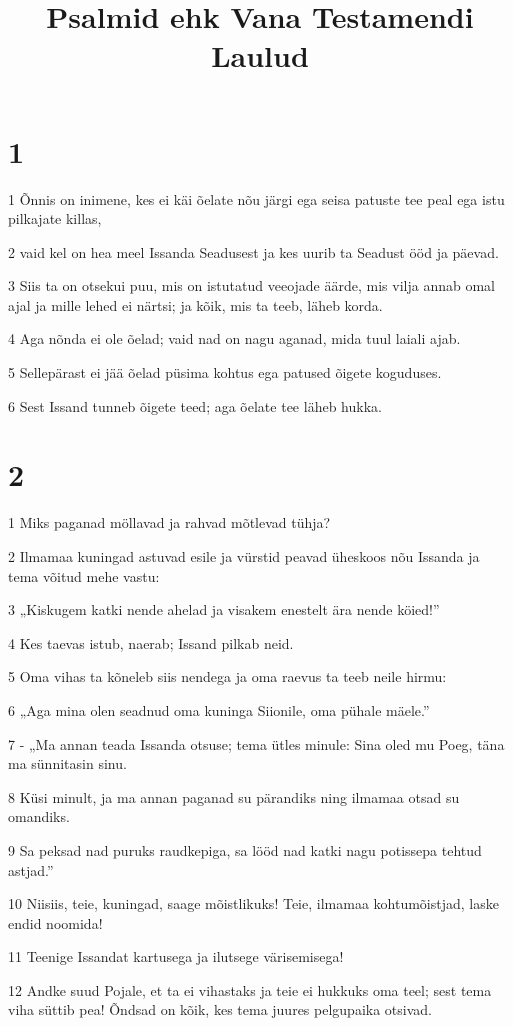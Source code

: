 

\title{Psalmid ehk Vana Testamendi Laulud}

\chapter{1}

\par 1 Õnnis on inimene, kes ei käi õelate nõu järgi ega seisa patuste tee peal ega istu pilkajate killas,
\par 2 vaid kel on hea meel Issanda Seadusest ja kes uurib ta Seadust ööd ja päevad.
\par 3 Siis ta on otsekui puu, mis on istutatud veeojade äärde, mis vilja annab omal ajal ja mille lehed ei närtsi; ja kõik, mis ta teeb, läheb korda.
\par 4 Aga nõnda ei ole õelad; vaid nad on nagu aganad, mida tuul laiali ajab.
\par 5 Sellepärast ei jää õelad püsima kohtus ega patused õigete koguduses.
\par 6 Sest Issand tunneb õigete teed; aga õelate tee läheb hukka.

\chapter{2}

\par 1 Miks paganad möllavad ja rahvad mõtlevad tühja?
\par 2 Ilmamaa kuningad astuvad esile ja vürstid peavad üheskoos nõu Issanda ja tema võitud mehe vastu:
\par 3 „Kiskugem katki nende ahelad ja visakem enestelt ära nende köied!”
\par 4 Kes taevas istub, naerab; Issand pilkab neid.
\par 5 Oma vihas ta kõneleb siis nendega ja oma raevus ta teeb neile hirmu:
\par 6 „Aga mina olen seadnud oma kuninga Siionile, oma pühale mäele.”
\par 7 - „Ma annan teada Issanda otsuse; tema ütles minule: Sina oled mu Poeg, täna ma sünnitasin sinu.
\par 8 Küsi minult, ja ma annan paganad su pärandiks ning ilmamaa otsad su omandiks.
\par 9 Sa peksad nad puruks raudkepiga, sa lööd nad katki nagu potissepa tehtud astjad.”
\par 10 Niisiis, teie, kuningad, saage mõistlikuks! Teie, ilmamaa kohtumõistjad, laske endid noomida!
\par 11 Teenige Issandat kartusega ja ilutsege värisemisega!
\par 12 Andke suud Pojale, et ta ei vihastaks ja teie ei hukkuks oma teel; sest tema viha süttib pea! Õndsad on kõik, kes tema juures pelgupaika otsivad.

